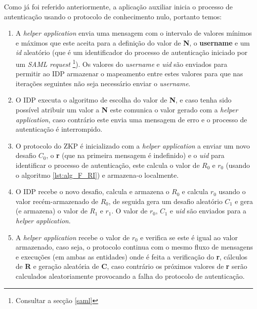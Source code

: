 \quad Como já foi referido anteriormente, a aplicação auxiliar inicia o processo de autenticação usando o protocolo de conhecimento nulo, portanto temos:
\begin{enumerate}
    \item A \textit{helper application} envia uma mensagem com o intervalo de valores mínimos e máximos que este aceita para a definição do valor de \textbf{N}, o \textbf{username} e um \textit{id} aleatório (que é um identificador do processo de autenticação iniciado por um \textit{SAML request} \footnote{Consultar a secção \ref{saml}}). Os valores do \textit{username} e \textit{uid} são enviados para permitir ao IDP armazenar o mapeamento entre estes valores para que nas iterações seguintes não seja necessário enviar o \textit{username}.
    \item O IDP executa o algoritmo de escolha do valor de \textbf{N}, e caso tenha sido possível atribuir um valor a \textbf{N} este comunica o valor gerado com a \textit{helper application}, caso contrário este envia uma mensagem de erro e o processo de autenticação é interrompido.
    \item O protocolo do ZKP é inicializado com a \textit{helper application} a enviar um novo desafio \textbf{$C_0$}, o \textbf{r} (que na primeira mensagem é indefinido) e o \textit{uid} para identificar o processo de autenticação, este calcula o valor de \textbf{$R_0$}  e \textbf{$r_0$} (usando o algoritmo \ref{lst:alg_F_RI}) e armazena-o localmente. 
    \item O IDP recebe o novo desafio, calcula e armazena o \textbf{$R_0$} e calcula \textbf{$r_0$} usando o valor recém-armazenado de \textbf{$R_0$}, de seguida gera um desafio aleatório \textbf{$C_1$} e gera (e armazena) o valor de \textbf{$R_1$} e \textbf{$r_1$}. O valor de \textbf{$r_0$}, \textbf{$C_1$} e \textit{uid} são enviados para a \textit{helper application}.
    \item A \textit{helper application} recebe o valor de $r_0$ e verifica se este é igual ao valor armazenado, caso seja, o protocolo continua com o mesmo fluxo de mensagens e execuções (em ambas as entidades) onde é feita a verificação do \textbf{r}, cálculos de \textbf{R} e geração aleatória de \textbf{C}, caso contrário os próximos valores de \textbf{r} serão calculados aleatoriamente provocando a falha do protocolo de autenticação.
\end{enumerate}

